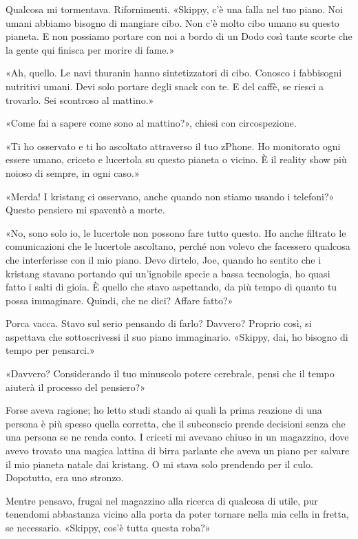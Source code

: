 Qualcosa mi tormentava. Rifornimenti. «Skippy, c'è una falla nel tuo
piano. Noi umani abbiamo bisogno di mangiare cibo. Non c'è molto cibo
umano su questo pianeta. E non possiamo portare con noi a bordo di un
Dodo così tante scorte che la gente qui finisca per morire di fame.»

«Ah, quello. Le navi thuranin hanno sintetizzatori di cibo. Conosco i
fabbisogni nutritivi umani. Devi solo portare degli snack con te. E del
caffè, se riesci a trovarlo. Sei scontroso al mattino.»

«Come fai a sapere come sono al mattino?», chiesi con circospezione.

«Ti ho osservato e ti ho ascoltato attraverso il tuo zPhone. Ho
monitorato ogni essere umano, criceto e lucertola su questo pianeta o
vicino. È il reality show più noioso di sempre, in ogni caso.»

«Merda! I kristang ci osservano, anche quando non stiamo usando i
telefoni?» Questo pensiero mi spaventò a morte.

«No, sono solo io, le lucertole non possono fare tutto questo. Ho anche
filtrato le comunicazioni che le lucertole ascoltano, perché non volevo
che facessero qualcosa che interferisse con il mio piano. Devo dirtelo,
Joe, quando ho sentito che i kristang stavano portando qui un'ignobile
specie a bassa tecnologia, ho quasi fatto i salti di gioia. È quello che
stavo aspettando, da più tempo di quanto tu possa immaginare. Quindi,
che ne dici? Affare fatto?»

Porca vacca. Stavo sul serio pensando di farlo? Davvero? Proprio così,
si aspettava che sottoscrivessi il suo piano immaginario. «Skippy, dai,
ho bisogno di tempo per pensarci.»

«Davvero? Considerando il tuo minuscolo potere cerebrale, pensi che il
tempo aiuterà il processo del pensiero?»

Forse aveva ragione; ho letto studi stando ai quali la prima reazione di
una persona è più spesso quella corretta, che il subconscio prende
decisioni senza che una persona se ne renda conto. I criceti mi avevano
chiuso in un magazzino, dove avevo trovato una magica lattina di birra
parlante che aveva un piano per salvare il mio pianeta natale dai
kristang. O mi stava solo prendendo per il culo. Dopotutto, era uno
stronzo.

Mentre pensavo, frugai nel magazzino alla ricerca di qualcosa di utile,
pur tenendomi abbastanza vicino alla porta da poter tornare nella mia
cella in fretta, se necessario. «Skippy, cos'è tutta questa roba?»

